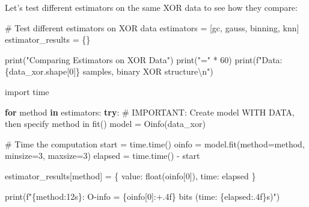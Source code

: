 \documentclass[
  11pt,
  letterpaper,
  oneside,
  openany]{book}
\newenvironment{Shaded}{\begin{snugshade}}{\end{snugshade}}
\newcommand{\BuiltInTok}[1]{\textcolor[rgb]{0.00,0.23,0.31}{#1}}
\newcommand{\CharTok}[1]{\textcolor[rgb]{0.13,0.47,0.30}{#1}}
\newcommand{\CommentTok}[1]{\textcolor[rgb]{0.37,0.37,0.37}{#1}}
\newcommand{\ControlFlowTok}[1]{\textcolor[rgb]{0.00,0.23,0.31}{\textbf{#1}}}
\newcommand{\DecValTok}[1]{\textcolor[rgb]{0.68,0.00,0.00}{#1}}
\newcommand{\ImportTok}[1]{\textcolor[rgb]{0.00,0.46,0.62}{#1}}
\newcommand{\KeywordTok}[1]{\textcolor[rgb]{0.00,0.23,0.31}{\textbf{#1}}}
\newcommand{\NormalTok}[1]{\textcolor[rgb]{0.00,0.23,0.31}{#1}}
\newcommand{\OperatorTok}[1]{\textcolor[rgb]{0.37,0.37,0.37}{#1}}
\newcommand{\SpecialCharTok}[1]{\textcolor[rgb]{0.37,0.37,0.37}{#1}}
\newcommand{\SpecialStringTok}[1]{\textcolor[rgb]{0.13,0.47,0.30}{#1}}
\newcommand{\StringTok}[1]{\textcolor[rgb]{0.13,0.47,0.30}{#1}}
\begin{document}
Let's test different estimators on the same XOR data to see how they
compare:

\begin{Shaded}
\begin{Highlighting}[]
\CommentTok{\# Test different estimators on XOR data}
\NormalTok{estimators }\OperatorTok{=}\NormalTok{ [}\StringTok{\textquotesingle{}gc\textquotesingle{}}\NormalTok{, }\StringTok{\textquotesingle{}gauss\textquotesingle{}}\NormalTok{, }\StringTok{\textquotesingle{}binning\textquotesingle{}}\NormalTok{, }\StringTok{\textquotesingle{}knn\textquotesingle{}}\NormalTok{]}
\NormalTok{estimator\_results }\OperatorTok{=}\NormalTok{ \{\}}

\BuiltInTok{print}\NormalTok{(}\StringTok{"Comparing Estimators on XOR Data"}\NormalTok{)}
\BuiltInTok{print}\NormalTok{(}\StringTok{"="} \OperatorTok{*} \DecValTok{60}\NormalTok{)}
\BuiltInTok{print}\NormalTok{(}\SpecialStringTok{f"Data: }\SpecialCharTok{\{}\NormalTok{data\_xor}\SpecialCharTok{.}\NormalTok{shape[}\DecValTok{0}\NormalTok{]}\SpecialCharTok{\}}\SpecialStringTok{ samples, binary XOR structure}\CharTok{\textbackslash{}n}\SpecialStringTok{"}\NormalTok{)}

\ImportTok{import}\NormalTok{ time}

\ControlFlowTok{for}\NormalTok{ method }\KeywordTok{in}\NormalTok{ estimators:}
    \ControlFlowTok{try}\NormalTok{:}
        \CommentTok{\# IMPORTANT: Create model WITH DATA, then specify method in fit()}
\NormalTok{        model }\OperatorTok{=}\NormalTok{ Oinfo(data\_xor)}
        
        \CommentTok{\# Time the computation}
\NormalTok{        start }\OperatorTok{=}\NormalTok{ time.time()}
\NormalTok{        oinfo }\OperatorTok{=}\NormalTok{ model.fit(method}\OperatorTok{=}\NormalTok{method, minsize}\OperatorTok{=}\DecValTok{3}\NormalTok{, maxsize}\OperatorTok{=}\DecValTok{3}\NormalTok{)}
\NormalTok{        elapsed }\OperatorTok{=}\NormalTok{ time.time() }\OperatorTok{{-}}\NormalTok{ start}
        
\NormalTok{        estimator\_results[method] }\OperatorTok{=}\NormalTok{ \{}
            \StringTok{\textquotesingle{}value\textquotesingle{}}\NormalTok{: }\BuiltInTok{float}\NormalTok{(oinfo[}\DecValTok{0}\NormalTok{]),}
            \StringTok{\textquotesingle{}time\textquotesingle{}}\NormalTok{: elapsed}
\NormalTok{        \}}
        
        \BuiltInTok{print}\NormalTok{(}\SpecialStringTok{f"}\SpecialCharTok{\{}\NormalTok{method}\SpecialCharTok{:12s\}}\SpecialStringTok{: O{-}info = }\SpecialCharTok{\{}\NormalTok{oinfo[}\DecValTok{0}\NormalTok{]}\SpecialCharTok{:+.4f\}}\SpecialStringTok{ bits  (time: }\SpecialCharTok{\{}\NormalTok{elapsed}\SpecialCharTok{:.4f\}}\SpecialStringTok{s)"}\NormalTok{)}
        

\end{Highlighting}
\end{Shaded}
\end{document}
